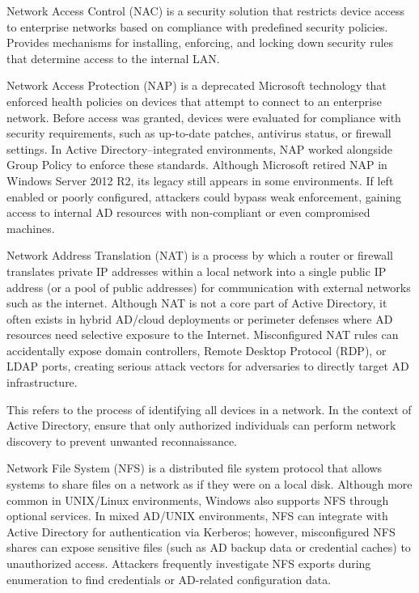  Network Access Control (NAC) is a security solution that restricts device access to enterprise networks based on compliance with predefined security policies. Provides mechanisms for installing, enforcing, and locking down security rules that determine access to the internal LAN.

 Network Access Protection (NAP) is a deprecated Microsoft technology that enforced health policies on devices that attempt to connect to an enterprise network. Before access was granted, devices were evaluated for compliance with security requirements, such as up-to-date patches, antivirus status, or firewall settings. In Active Directory–integrated environments, NAP worked alongside Group Policy to enforce these standards. Although Microsoft retired NAP in Windows Server 2012 R2, its legacy still appears in some environments. If left enabled or poorly configured, attackers could bypass weak enforcement, gaining access to internal AD resources with non-compliant or even compromised machines.

Network Address Translation (NAT) is a process by which a router or firewall translates private IP addresses within a local network into a single public IP address (or a pool of public addresses) for communication with external networks such as the internet. Although NAT is not a core part of Active Directory, it often exists in hybrid AD/cloud deployments or perimeter defenses where AD resources need selective exposure to the Internet. Misconfigured NAT rules can accidentally expose domain controllers, Remote Desktop Protocol (RDP), or LDAP ports, creating serious attack vectors for adversaries to directly target AD infrastructure.

 This refers to the process of identifying all devices in a network. In the context of Active Directory, ensure that only authorized individuals can perform network discovery to prevent unwanted reconnaissance.

 Network File System (NFS) is a distributed file system protocol that allows systems to share files on a network as if they were on a local disk. Although more common in UNIX/Linux environments, Windows also supports NFS through optional services. In mixed AD/UNIX environments, NFS can integrate with Active Directory for authentication via Kerberos; however, misconfigured NFS shares can expose sensitive files (such as AD backup data or credential caches) to unauthorized access. Attackers frequently investigate NFS exports during enumeration to find credentials or AD-related configuration data.

